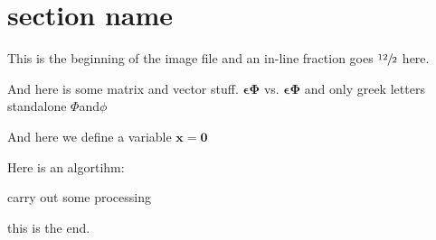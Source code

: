 \section{section name}
\label{sec:test_section}

This is the beginning of the image file and an in-line fraction
goes $\sfrac{12}{2}$ here. 
 

And here is some matrix and vector stuff.  $\bm{\epsilon} \bm{\Phi}$ vs.  $\mathbf{\epsilon} \mathbf{\Phi}$ and only greek letters standalone $\Phi $and$ \phi$
 
 And here we define a variable  
 \newcommand{\xVector}{\mathbf x}
     $\xVector = \mathbf 0$

Here is an algortihm:
\begin{algorithmic}
    \STATE carry out some processing
    \ENDFOR
\end{algorithmic}







\newlength\fheight
\newlength\fwidth
\setlength\fheight{4cm}
\setlength\fwidth{6cm}
%
%
%
%
    
% 
% 
% 
% 
% 
% 
% 


% 
% 
this is the end.
